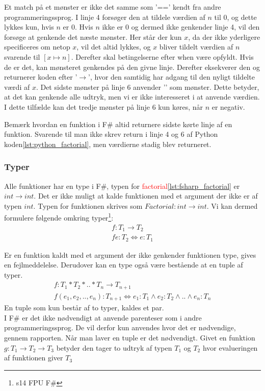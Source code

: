 Et match på et mønster er ikke det samme som '==' kendt fra andre programmeringssprog. I linje 4 forsøger den at tildele værdien af \(n\) til 0, og dette lykkes kun, hvis \(n\) er 0. Hvis \(n\) ikke er 0 og dermed ikke genkender linje 4, vil den forsøge at genkende det næste mønster. Her står der kun \(x\), da der ikke yderligere specificeres om netop \(x\), vil det altid lykkes, og \(x\) bliver tildelt værdien af \(n\) svarende til \( [x \mapsto n] \). Derefter skal betingelserne efter \textcolor{codepurple}{when} være opfyldt. Hvis de er det, kan mønsteret genkendes på den givne linje. Derefter eksekverer den og returnerer koden efter '$\rightarrow$', hvor den samtidig har adgang til den nyligt tildelte værdi af \(x\). 
Det sidste mønster på linje 6 anvender '\textunderscore' som mønster. 
Dette betyder, at det kan genkende alle udtryk, men vi er ikke interesseret i at anvende værdien. I dette tilfælde kan det tredje mønster på linje 6 kun køres, når \(n\) er negativ.

Bemærk hvordan en funktion i F\# altid returnere sidste kørte linje af en funktion. Svarende til man ikke skrev \textcolor{codepurple}{return} i linje 4 og 6 af Python koden\ref{lst:python_factorial}, men værdierne stadig blev returneret. 

\subsubsection{Typer}
Alle funktioner har en type i F\#, typen for \textcolor{red}{factorial}\ref{lst:fsharp_factorial} er $int \rightarrow int$. Det er ikke muligt at kalde funktionen med et argument der ikke er af typen $int$. Typen for funktionen skrives som $Factorial: int \rightarrow int$. Vi kan dermed formulere følgende omkring typer\footnote{s14 FPU F\#}: 
\begin{gather*}
    f: T_1 \rightarrow T_2 \\
    f e : T_2 \iff e : T_1
\end{gather*}

Er en funktion kaldt med et argument der ikke genkender funktionen type, gives en fejlmeddelelse. Derudover kan en type også være bestående at en tuple af typer.
\begin{gather*}
    f: T_1 * T_2 * .. * T_n \rightarrow T_{n+1}\\
    f (e_1, e_2, .., e_n) :T_{n+1} \iff e_1 : T_1 \land e_2 : T_2 \land .. \land e_n : T_n
\end{gather*}
En tuple som kun består af to typer, kaldes et par. \\I F\# er det ikke nødvendigt at anvende parenteser som i andre programmeringssprog. De vil derfor kun anvendes hvor det er nødvendige, gennem rapporten. Når man laver en tuple er det nødvendigt.
Givet en funktion $g: T_1 \rightarrow T_2 \rightarrow T_3$ betyder den tager to udtryk af typen $T_1$ og $T_2$ hvor evalueringen af funktionen giver $T_3$
 
